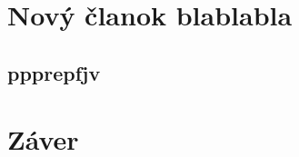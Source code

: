 \documentclass[10pt,twoside,english,a4paper]{article}
\begin{document}
\section{Nový članok blablabla}
\subsection{ppprepfjv}



\section{Záver} \label{zaver} %






\end{document}
